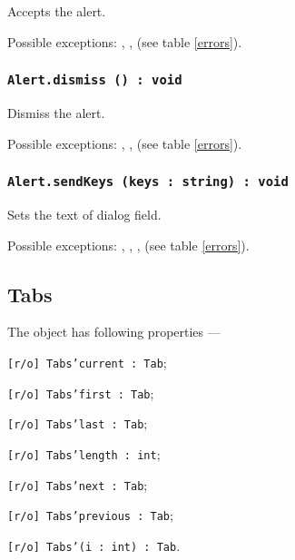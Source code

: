 Accepts the alert.

Possible exceptions: , ,  (see table \ref{errors}).

\subsubsection{\texttt{Alert.dismiss () : void}}

Dismiss the alert.

Possible exceptions: , ,  (see table \ref{errors}).

\subsubsection{\texttt{Alert.sendKeys (keys : string) : void}}

Sets the text of dialog field.

Possible exceptions: , , ,  (see table \ref{errors}).

\subsection{{\color{orange} Tabs}}

The object \tabs{} has following properties —
\begin{icItems}
	\item \texttt{[r/o] Tabs'current : Tab};
	\item \texttt{[r/o] Tabs'first : Tab};
	\item \texttt{[r/o] Tabs'last : Tab};
	\item \texttt{[r/o] Tabs'length : int};
	\item \texttt{[r/o] Tabs'next : Tab};
	\item \texttt{[r/o] Tabs'previous : Tab};
	\item \texttt{[r/o] Tabs'(i : int) : Tab}.
\end{icItems}

